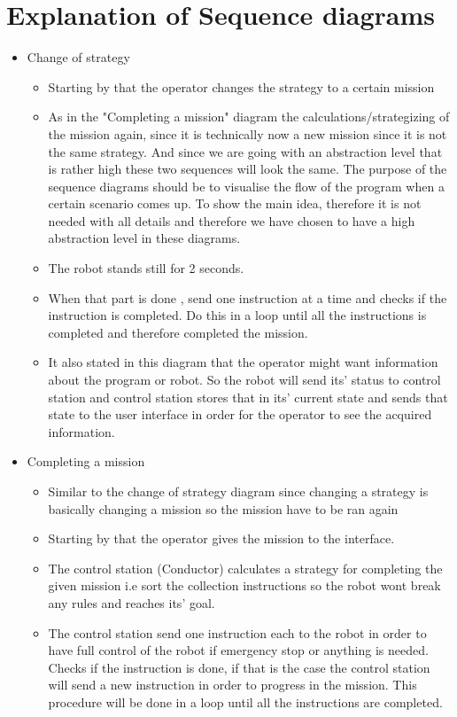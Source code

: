 \section{Explanation of Sequence diagrams}
\begin{itemize}
    \item Change of strategy 
       \begin{itemize}
           \item Starting by that the operator changes the strategy to a certain mission
           \item As in the "Completing a mission" diagram the calculations/strategizing of the mission again, since it is technically now a new mission since it is not the same strategy. And since we are going with an abstraction level that is rather high these two sequences will look the same. The purpose of the sequence diagrams should be to visualise the flow of the program when a certain scenario comes up. To show the main idea, therefore it is not needed with all details and therefore we have chosen to have a high abstraction level in these diagrams. 
           \item The robot stands still for 2 seconds.
           \item When that part is done , send one instruction at a time and checks if the instruction is completed. Do this in a loop until all the instructions is completed and therefore completed the mission.
           \item It also stated in this diagram that the operator might want information about the program or robot. So the robot will send its' status to control station and control station stores that in its' current state and sends that state to the user interface in order for the operator to see the acquired information.
       \end{itemize}
    \item Completing a mission
       \begin{itemize}
           \item Similar to the change of strategy diagram since changing a strategy is basically changing a mission so the mission have to be ran again
           \item Starting by that the operator gives the mission to the interface.
           \item The control station (Conductor) calculates a strategy for completing the given mission i.e sort the collection instructions so the robot wont break any rules and reaches its' goal.
           \item The control station send one instruction each to the robot in order to have full control of the robot if emergency stop or anything is needed. Checks if the instruction is done, if that is the case the control station will send a new instruction in order to progress in the mission. This procedure will be done in a loop until all the instructions are completed.

\end{itemize}
\end{itemize}
